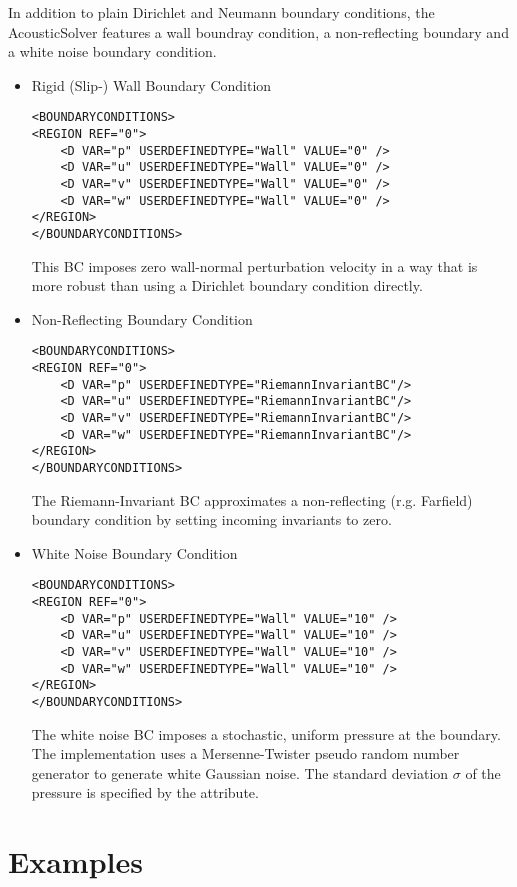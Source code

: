In addition to plain Dirichlet and Neumann boundary conditions, the AcousticSolver features a wall boundray condition, a non-reflecting boundary and a white noise boundary condition.
\begin{itemize}
\item Rigid (Slip-) Wall Boundary Condition 
\begin{lstlisting}[style=XmlStyle]
<BOUNDARYCONDITIONS>
<REGION REF="0">
    <D VAR="p" USERDEFINEDTYPE="Wall" VALUE="0" />
    <D VAR="u" USERDEFINEDTYPE="Wall" VALUE="0" />
    <D VAR="v" USERDEFINEDTYPE="Wall" VALUE="0" />
    <D VAR="w" USERDEFINEDTYPE="Wall" VALUE="0" />
</REGION>
</BOUNDARYCONDITIONS>
\end{lstlisting}
This BC imposes zero wall-normal perturbation velocity in a way that is more robust than using a Dirichlet boundary condition directly.

\item Non-Reflecting Boundary Condition
\begin{lstlisting}[style=XmlStyle]
<BOUNDARYCONDITIONS>
<REGION REF="0">
    <D VAR="p" USERDEFINEDTYPE="RiemannInvariantBC"/>
    <D VAR="u" USERDEFINEDTYPE="RiemannInvariantBC"/>
    <D VAR="v" USERDEFINEDTYPE="RiemannInvariantBC"/>
    <D VAR="w" USERDEFINEDTYPE="RiemannInvariantBC"/>
</REGION>
</BOUNDARYCONDITIONS>
\end{lstlisting}
The Riemann-Invariant BC approximates a non-reflecting (r.g. Farfield)  boundary condition by setting incoming invariants to zero.

\item White Noise Boundary Condition
\begin{lstlisting}[style=XmlStyle]
<BOUNDARYCONDITIONS>
<REGION REF="0">
    <D VAR="p" USERDEFINEDTYPE="Wall" VALUE="10" />
    <D VAR="u" USERDEFINEDTYPE="Wall" VALUE="10" />
    <D VAR="v" USERDEFINEDTYPE="Wall" VALUE="10" />
    <D VAR="w" USERDEFINEDTYPE="Wall" VALUE="10" />
</REGION>
</BOUNDARYCONDITIONS>
\end{lstlisting}
The white noise BC imposes a stochastic, uniform pressure at the boundary. The implementation uses a Mersenne-Twister pseudo random number generator to generate white Gaussian noise.
The standard deviation $\sigma$ of the pressure  is specified by the  attribute.

\end{itemize}


\section{Examples}
